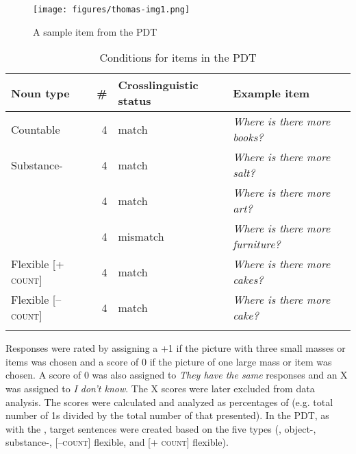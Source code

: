 \documentclass[output=paper]{langsci/langscibook}
\begin{document}
\begin{figure}[t]
\texttt{[image: figures/thomas-img1.png]} 
\caption{\label{fig:thomas:2} A sample item from the PDT}
\end{figure}

\begin{table}
\caption{Conditions for items in the PDT}
\label{tab:thomas:5}

\begin{tabularx}{\textwidth}{lrQl}
\lsptoprule

\textbf{Noun type} & \textbf{\#} & \textbf{Crosslinguistic status} & \textbf{Example item}\\
\midrule 
Countable & 4 & match & \textit{Where is there more books?}\\

\tablevspace
Substance- & 4 & match & \textit{Where is there more salt?}\\

\tablevspace
{} & 4 & match & \textit{Where is there more art?}\\
& 4 & mismatch & \textit{Where is there more furniture?}\\

\tablevspace
Flexible [\textsc{+ count}] & 4 & match & \textit{Where is there more cakes?}\\

\tablevspace
Flexible [\textsc{– count}] & 4 & match & \textit{Where is there more cake?}\\
\lspbottomrule
\end{tabularx}
\end{table}

Responses were rated by assigning a +1 if the picture with three small masses or items was chosen and a score of 0 if the picture of one large mass or item was chosen. A score of 0 was also assigned to \textit{They have the same} responses and an X was assigned to \textit{I don’t know}. The X scores were later excluded from data analysis. The scores were calculated and analyzed as percentages of  (e.g. total number of 1s divided by the total number of that  presented). In the PDT, as with the , target sentences were created based on the five  types (, object-, substance-, [\textsc{–count}] flexible, and [\textsc{+ count}] flexible). 
\end{document}
